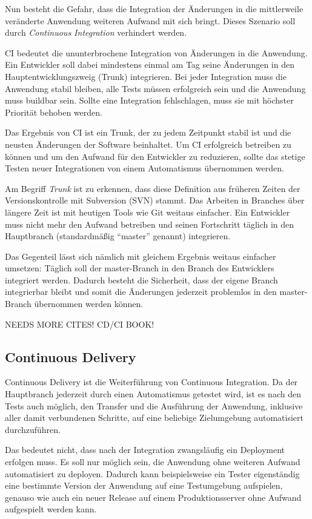 Nun besteht die Gefahr, dass die Integration der Änderungen in die mittlerweile veränderte Anwendung weiteren Aufwand mit sich bringt. Dieses Szenario soll durch \emph{Continuous Integration} verhindert werden.

\ac{CI} bedeutet die ununterbrochene Integration von Änderungen in die Anwendung. Ein Entwickler soll dabei mindestens einmal am Tag seine Änderungen in den Hauptentwicklungszweig (Trunk) integrieren. Bei jeder Integration muss die Anwendung stabil bleiben, alle Tests müssen erfolgreich sein und die Anwendung muss buildbar sein. Sollte eine Integration fehlschlagen, muss sie mit höchster Priorität behoben werden.

Das Ergebnis von \ac{CI} ist ein Trunk, der zu jedem Zeitpunkt stabil ist und die neusten Änderungen der Software beinhaltet. Um \ac{CI} erfolgreich betreiben zu können und um den Aufwand für den Entwickler zu reduzieren, sollte das stetige Testen neuer Integrationen von einem Automatismus übernommen werden.

Am Begriff \emph{Trunk} ist zu erkennen, dass diese Definition aus früheren Zeiten der Versionskontrolle mit Subversion (SVN) stammt. Das Arbeiten in Branches über längere Zeit ist mit heutigen Tools wie Git weitaus einfacher. Ein Entwickler muss nicht mehr den Aufwand betreiben und seinen Fortschritt täglich in den Hauptbranch (standardmäßig ``master'' genannt) integrieren.

Das Gegenteil lässt sich nämlich mit gleichem Ergebnis weitaus einfacher umsetzen: Täglich soll der master-Branch in den Branch des Entwicklers integriert werden. Dadurch besteht die Sicherheit, dass der eigene Branch integrierbar bleibt und somit die Änderungen jederzeit problemlos in den master-Branch übernommen werden können.

{\draft NEEDS MORE CITES! CD/CI BOOK!}

\subsection{Continuous Delivery}

Continuous Delivery ist die Weiterführung von Continuous Integration. Da der Hauptbranch jederzeit durch einen Automatismus getestet wird, ist es nach den Tests auch möglich, den Transfer und die Ausführung der Anwendung, inklusive aller damit verbundenen Schritte, auf eine beliebige Zielumgebung automatisiert durchzuführen.

Das bedeutet nicht, dass nach der Integration zwangsläufig ein Deployment erfolgen muss. Es soll nur möglich sein, die Anwendung ohne weiteren Aufwand automatisiert zu deployen. Dadurch kann beispielsweise ein Tester eigenständig eine bestimmte Version der Anwendung auf eine Testumgebung aufspielen, genauso wie auch ein neuer Release auf einem Produktionsserver ohne Aufwand aufgespielt werden kann.


